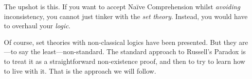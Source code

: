 \documentclass[../../../include/open-logic-section]{subfiles}
\begin{document}
The upshot is this. If you want to accept Na\"{i}ve Comprehension
whilst \emph{avoiding} inconsistency, you cannot just tinker with the
\emph{set theory}. Instead, you would have to overhaul your
\emph{logic}.

Of course, set theories with non-classical logics have been presented.
But they are---to say the least---non-standard. The standard approach
to Russell's Paradox is to treat it as a straightforward non-existence
proof, and then to try to learn how to live with it. That is the
approach we will follow.
\end{document}
